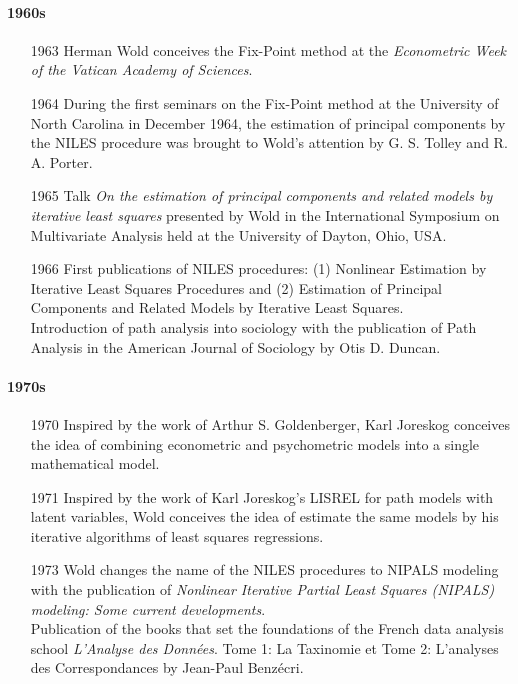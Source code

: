 \documentclass[12pt]{book}\usepackage{graphicx, color}
\begin{document}
\paragraph{1960s}
\begin{enumerate}
 \item[1963] Herman Wold conceives the Fix-Point method at the \textit{Econometric Week of the Vatican Academy of Sciences}.
 \item[1964] During the first seminars on the Fix-Point method at the University of North Carolina in December 1964, the estimation of principal components by the NILES procedure was brought to Wold's attention by G. S. Tolley and R. A. Porter.
 \item[1965] Talk \textit{On the estimation of principal components and related models by iterative least squares} presented by Wold in the International Symposium on Multivariate Analysis held at the University of Dayton, Ohio, USA.
 \item[1966] First publications of NILES procedures: (1) Nonlinear Estimation by Iterative Least Squares Procedures and (2) Estimation of Principal Components and Related Models by Iterative Least Squares. \\
 Introduction of path analysis into sociology with the publication of Path Analysis in the American Journal of Sociology by Otis D. Duncan.
\end{enumerate}

\paragraph{1970s}
\begin{enumerate}
 \item[1970] Inspired by the work of Arthur S. Goldenberger, Karl Joreskog conceives the idea of combining econometric and psychometric models into a single mathematical model.
 \item[1971] Inspired by the work of Karl Joreskog's LISREL for path models with latent variables, Wold conceives the idea of estimate the same models by his iterative algorithms of least squares regressions.
 \item[1973] Wold changes the name of the NILES procedures to NIPALS modeling with the publication of \textit{Nonlinear Iterative Partial Least Squares (NIPALS) modeling: Some current developments}. \\
 Publication of the books that set the foundations of the French data analysis school \textit{L'Analyse des Donn\'{e}es}. Tome 1: La Taxinomie et Tome 2: L'analyses des Correspondances by Jean-Paul Benz\'{e}cri.
\end{enumerate}
\end{document}
